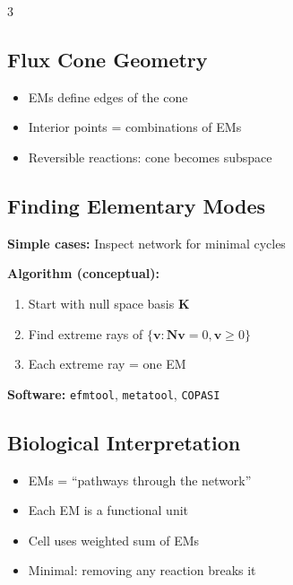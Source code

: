 \documentclass[10pt,landscape,letter]{article}
\begin{document}
\begin{multicols}{3}
\subsection{Flux Cone Geometry}
\begin{center}
\end{center}
\begin{itemize}
\item EMs define edges of the cone
\item Interior points = combinations of EMs
\item Reversible reactions: cone becomes subspace
\end{itemize}

\subsection{Finding Elementary Modes}

\textbf{Simple cases:} Inspect network for minimal cycles

\textbf{Algorithm (conceptual):}
\begin{enumerate}
\item Start with null space basis $\mathbf{K}$
\item Find extreme rays of $\{\mathbf{v}: \mathbf{N}\mathbf{v}=0, \mathbf{v}\geq 0\}$
\item Each extreme ray = one EM
\end{enumerate}

\textbf{Software:} \texttt{efmtool}, \texttt{metatool}, \texttt{COPASI}

\subsection{Biological Interpretation}
\begin{itemize}
\item EMs = ``pathways through the network''
\item Each EM is a functional unit
\item Cell uses weighted sum of EMs
\item Minimal: removing any reaction breaks it
\end{itemize}


\end{multicols}
\end{document}
